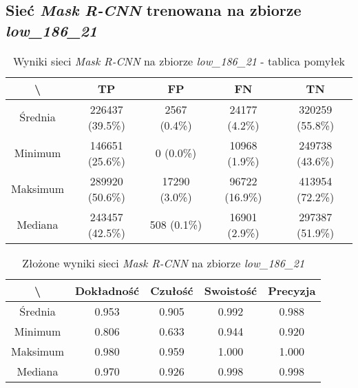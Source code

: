 \subsection{Sieć \textit{Mask R-CNN} trenowana na zbiorze \textit{low\_186\_21}}

\begin{table}[H]
  \centering
	\caption{Wyniki sieci \textit{Mask R-CNN} na zbiorze \textit{low\_186\_21} - tablica pomyłek}
	\vspace{6pt}
	{\footnotesize
		\begin{tabular}{|c|c|c|c|c|}
      \hline \textbackslash & TP & FP & FN & TN \\
      \hline Średnia & 226437 (39.5\%) & 2567 (0.4\%) & 24177 (4.2\%) & 320259 (55.8\%) \\
      \hline Minimum & 146651 (25.6\%) & 0 (0.0\%) & 10968 (1.9\%) & 249738 (43.6\%) \\
      \hline Maksimum & 289920 (50.6\%) & 17290 (3.0\%) & 96722 (16.9\%) & 413954 (72.2\%) \\
      \hline Mediana & 243457 (42.5\%) & 508 (0.1\%) & 16901 (2.9\%) & 297387 (51.9\%) \\
      \hline
		\end{tabular}
	}
  \vspace{0pt}
  \label{Tab:low_original}
\end{table}


\begin{table}[H]
	\centering
	\caption{Złożone wyniki sieci \textit{Mask R-CNN} na zbiorze \textit{low\_186\_21}}
	\vspace{6pt}
	{\footnotesize
		\begin{tabular}{|c|c|c|c|c|}
      \hline \textbackslash & Dokładność & Czułość & Swoistość & Precyzja \\
      \hline Średnia & 0.953 & 0.905 & 0.992 & 0.988 \\
      \hline Minimum & 0.806 & 0.633 & 0.944 & 0.920 \\
      \hline Maksimum & 0.980 & 0.959 & 1.000 & 1.000 \\
      \hline Mediana & 0.970 & 0.926 & 0.998 & 0.998 \\
      \hline
		\end{tabular}
	}
  \vspace{0pt}
  \label{Tab:low_original_calculated}
\end{table}

